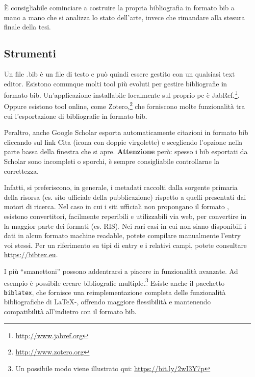 \`E consigliabile cominciare a costruire la propria bibliografia in formato bib a mano a mano che si analizza lo stato dell'arte, invece che rimandare alla stesura finale della tesi.

\subsection{Strumenti}

Un file .bib \`e un file di testo e pu\`o quindi essere gestito con un qualsiasi text editor. Esistono comunque molti tool pi\`u evoluti per gestire bibliografie in formato bib. Un'applicazione installabile localmente sul proprio pc \`e JabRef.\footnote{\url{http://www.jabref.org}}. Oppure esistono tool online, come Zotero,\footnote{\url{http://www.zotero.org}} che forniscono molte funzionalità tra cui l'esportazione di bibliografie in formato bib.

Peraltro, anche Google Scholar esporta automaticamente citazioni in formato bib cliccando sul link Cita (icona con doppie virgolette) e scegliendo l'opzione  nella parte bassa della finestra che si apre. \textbf{Attenzione} per\`o: spesso i bib esportati da Scholar sono incompleti o sporchi, \`e sempre consigliabile controllarne la correttezza.

Infatti, si preferiscono, in generale, i metadati raccolti dalla sorgente primaria della risorsa (es. sito ufficiale della pubblicazione) rispetto a quelli presentati dai motori di ricerca. Nel caso in cui i siti ufficiali non propongano il formato , esistono convertitori, facilmente reperibili e utilizzabili via web, per convertire in  la maggior parte dei formati (es. RIS). Nei rari casi in cui non siano disponibili i dati in alcun formato machine readable, potete compilare manualmente l'entry  voi stessi. Per un riferimento su tipi di entry e i relativi campi, potete consultare \url{https://bibtex.eu}.

I pi\`u ``smanettoni'' possono addentrarsi a piacere in funzionalit\`a avanzate. Ad esempio \`e possibile creare bibliografie multiple.\footnote{Un possibile modo viene illustrato qui: \url{https://bit.ly/2wI3Y7p}}
Esiste anche il pacchetto \texttt{biblatex}, che fornisce una reimplementazione completa delle funzionalit\`a bibliografiche di \LaTeX-, offrendo maggiore flessibilit\`a e mantenendo compatibilit\`a all'indietro con il formato bib.
